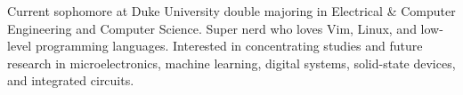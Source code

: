 

\begin{cvparagraph}

Current sophomore at Duke University double majoring in Electrical \& Computer Engineering and Computer Science. Super nerd who loves Vim, Linux, and low-level programming languages. Interested in concentrating studies and future research in microelectronics, machine learning, digital systems, solid-state devices, and integrated circuits.
\end{cvparagraph}
